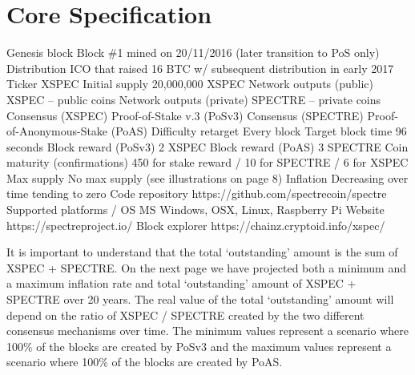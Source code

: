 \section{Core Specification}
Genesis block Block \#1 mined on 20/11/2016 (later transition to PoS only) 
Distribution ICO that raised 16 BTC w/ subsequent distribution in early 2017 
Ticker XSPEC 
Initial supply 20,000,000 XSPEC 
Network outputs (public) XSPEC – public coins 
Network outputs (private) SPECTRE – private coins 
Consensus (XSPEC) Proof-of-Stake v.3 (PoSv3) 
Consensus (SPECTRE) Proof-of-Anonymous-Stake (PoAS) 
Difficulty retarget Every block 
Target block time 96 seconds 
Block reward (PoSv3) 2 XSPEC 
Block reward (PoAS) 3 SPECTRE 
Coin maturity (confirmations) 450 for stake reward / 10 for SPECTRE / 6 for XSPEC 
Max supply No max supply (see illustrations on page 8) 
Inflation Decreasing over time tending to zero 
Code repository https://github.com/spectrecoin/spectre 
Supported platforms / OS MS Windows, OSX, Linux, Raspberry Pi 
Website https://spectreproject.io/ 
Block explorer https://chainz.cryptoid.info/xspec/ 

 

It is important to understand that the total ‘outstanding’ amount is the sum of XSPEC + SPECTRE. On the next page we have projected both a minimum and a maximum inflation rate and total ‘outstanding’ amount of XSPEC + SPECTRE over 20 years. The real value of the total ‘outstanding’ amount will depend on the ratio of XSPEC / SPECTRE created by the two different consensus mechanisms over time. The minimum values represent a scenario where 100\% of the blocks are created by PoSv3 and the maximum values represent a scenario where 100\% of the blocks are created by PoAS.